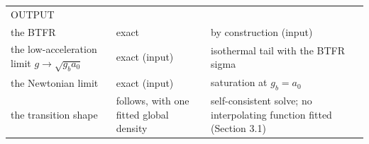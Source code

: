 \documentclass[
  10pt,
]{article}
\begin{document}
\begin{longtable}[]{@{}lll@{}}
\begin{minipage}[t]{0.24\columnwidth}\raggedright
OUTPUT\strut
\end{minipage} & \begin{minipage}[t]{0.20\columnwidth}\raggedright
\strut
\end{minipage} & \begin{minipage}[t]{0.50\columnwidth}\raggedright
\strut
\end{minipage}\tabularnewline
\begin{minipage}[t]{0.24\columnwidth}\raggedright
the BTFR\strut
\end{minipage} & \begin{minipage}[t]{0.20\columnwidth}\raggedright
exact\strut
\end{minipage} & \begin{minipage}[t]{0.50\columnwidth}\raggedright
by construction (input)\strut
\end{minipage}\tabularnewline
\begin{minipage}[t]{0.24\columnwidth}\raggedright
the low-acceleration limit $g\to\sqrt{g_b a_0}$\strut
\end{minipage} & \begin{minipage}[t]{0.20\columnwidth}\raggedright
exact (input)\strut
\end{minipage} & \begin{minipage}[t]{0.50\columnwidth}\raggedright
isothermal tail with the BTFR sigma\strut
\end{minipage}\tabularnewline
\begin{minipage}[t]{0.24\columnwidth}\raggedright
the Newtonian limit\strut
\end{minipage} & \begin{minipage}[t]{0.20\columnwidth}\raggedright
exact (input)\strut
\end{minipage} & \begin{minipage}[t]{0.50\columnwidth}\raggedright
saturation at $g_b=a_0$\strut
\end{minipage}\tabularnewline
\begin{minipage}[t]{0.24\columnwidth}\raggedright
the transition shape\strut
\end{minipage} & \begin{minipage}[t]{0.20\columnwidth}\raggedright
follows, with one fitted global density\strut
\end{minipage} & \begin{minipage}[t]{0.50\columnwidth}\raggedright
self-consistent solve; no interpolating function fitted (Section 3.1)\strut

\end{minipage}
\end{longtable}
\end{document}
